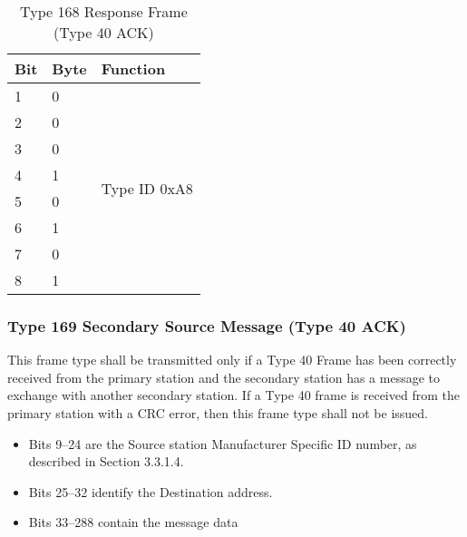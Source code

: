 \documentclass[]{article}
\begin{document}
\begin{table}[ht]
	\centering
	\begin{tabular}{lll}
		\hline
		\textbf{Bit} & \textbf{Byte} & \textbf{Function}             \\ \hline
		1            & 0             & \multirow{8}{*}{Type ID 0xA8} \\
		2            & 0             &                               \\
		3            & 0             &                               \\
		4            & 1             &                               \\
		5            & 0             &                               \\
		6            & 1             &                               \\
		7            & 0             &                               \\
		8            & 1             &                               \\ \hline
	\end{tabular}
	\caption{Type 168 Response Frame (Type 40 ACK)}
	\label{tab:type-169-frame}
\end{table}

\clearpage

\subsubsection{Type 169 Secondary Source Message (Type 40 ACK)}
This frame type shall be transmitted only if a Type 40 Frame has been correctly received from the primary station and the secondary station has a message to exchange with another secondary station. If a Type 40 frame is received from the primary station with a CRC error, then this frame type shall not be issued.

\begin{itemize}
	\item Bits 9–24 are the Source station Manufacturer Specific ID number, as described in Section 3.3.1.4.
	\item Bits 25–32 identify the Destination address.
	\item Bits 33–288 contain the message data
\end{itemize}
\end{document}
